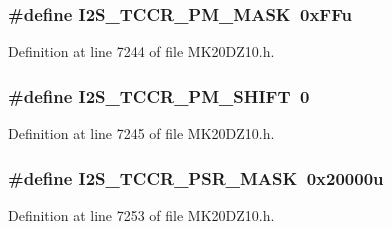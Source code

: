 \subsubsection[{\texorpdfstring{I2\+S\+\_\+\+T\+C\+C\+R\+\_\+\+P\+M\+\_\+\+M\+A\+SK}{I2S_TCCR_PM_MASK}}]{\setlength{\rightskip}{0pt plus 5cm}\#define I2\+S\+\_\+\+T\+C\+C\+R\+\_\+\+P\+M\+\_\+\+M\+A\+SK~0x\+F\+Fu}\hypertarget{group___i2_s___register___masks_ga7225350c20b670adfb6dc0aa6414dc68}{}\label{group___i2_s___register___masks_ga7225350c20b670adfb6dc0aa6414dc68}


Definition at line 7244 of file M\+K20\+D\+Z10.\+h.

\subsubsection[{\texorpdfstring{I2\+S\+\_\+\+T\+C\+C\+R\+\_\+\+P\+M\+\_\+\+S\+H\+I\+FT}{I2S_TCCR_PM_SHIFT}}]{\setlength{\rightskip}{0pt plus 5cm}\#define I2\+S\+\_\+\+T\+C\+C\+R\+\_\+\+P\+M\+\_\+\+S\+H\+I\+FT~0}\hypertarget{group___i2_s___register___masks_gaf94f665bef7f948118722c381f5bdd04}{}\label{group___i2_s___register___masks_gaf94f665bef7f948118722c381f5bdd04}


Definition at line 7245 of file M\+K20\+D\+Z10.\+h.

\subsubsection[{\texorpdfstring{I2\+S\+\_\+\+T\+C\+C\+R\+\_\+\+P\+S\+R\+\_\+\+M\+A\+SK}{I2S_TCCR_PSR_MASK}}]{\setlength{\rightskip}{0pt plus 5cm}\#define I2\+S\+\_\+\+T\+C\+C\+R\+\_\+\+P\+S\+R\+\_\+\+M\+A\+SK~0x20000u}\hypertarget{group___i2_s___register___masks_ga46921bd1d04eecda321a3a4351873c6d}{}\label{group___i2_s___register___masks_ga46921bd1d04eecda321a3a4351873c6d}


Definition at line 7253 of file M\+K20\+D\+Z10.\+h.

